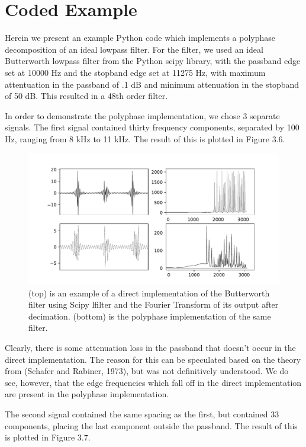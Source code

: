 \documentclass{report}
\begin{document}
\section{Coded Example}

Herein we present an example Python code which implements a polyphase decomposition of an ideal lowpass filter.  For the filter, we used an ideal Butterworth lowpass filter from the Python scipy library, with the passband edge set at 10000 Hz and the stopband edge set at 11275 Hz, with maximum attentuation in the passband of .1 dB and minimum attenuation in the stopband of 50 dB.  This resulted in a 48th order filter.

In order to demonstrate the polyphase implementation, we chose 3 separate signals.  The first signal contained thirty frequency components, separated by 100 Hz, ranging from 8 kHz to 11 kHz. The result of this is plotted in Figure 3.6.

\begin{figure}[ht]
\includegraphics[scale=.55]{Figure_6.pdf}
\caption{(top) is an example of a direct implementation of the Butterworth filter using Scipy lfilter and the Fourier Transform of its output after decimation. (bottom) is the polyphase implementation of the same filter.}
\end{figure} 

Clearly, there is some attenuation loss in the passband that doesn't occur in the direct implementation. The reason for this can be speculated based on the theory from (Schafer and Rabiner, 1973), but was not definitively understood.  We do see, however, that the edge frequencies which fall off in the direct implementation are present in the polyphase implementation.  

The second signal contained the same spacing as the first, but contained 33 components, placing the last component outside the passband.  The result of this is plotted in Figure 3.7.
\end{document}

